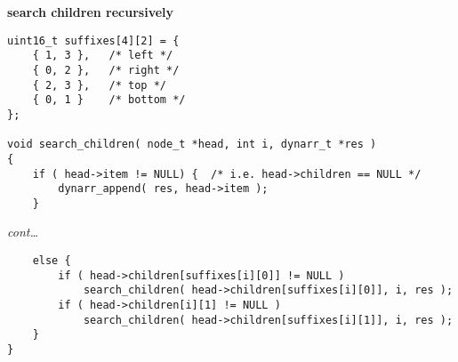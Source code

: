 \begin{frame}[fragile]
    \textbf{search children recursively}
    \begin{verbatim}
uint16_t suffixes[4][2] = {
    { 1, 3 },   /* left */
    { 0, 2 },   /* right */
    { 2, 3 },   /* top */
    { 0, 1 }    /* bottom */
};

void search_children( node_t *head, int i, dynarr_t *res )
{
    if ( head->item != NULL) {  /* i.e. head->children == NULL */
        dynarr_append( res, head->item );
    }
    \end{verbatim}
\end{frame}

\begin{frame}[fragile]
    \textit{cont\dots}
    \begin{verbatim}
    else {
        if ( head->children[suffixes[i][0]] != NULL )
            search_children( head->children[suffixes[i][0]], i, res );
        if ( head->children[i][1] != NULL )
            search_children( head->children[suffixes[i][1]], i, res );
    }
}
\end{verbatim}
\end{frame}
